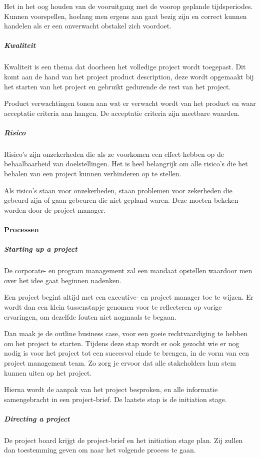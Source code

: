 \documentclass[]{article}
\begin{document}
Het in het oog houden van de vooruitgang met de voorop geplande tijdsperiodes. Kunnen voorspellen, hoelang men ergens aan gaat bezig zijn en correct kunnen handelen als er een onverwacht obstakel zich voordoet.

\subparagraph{Kwaliteit}
Kwaliteit is een thema dat doorheen het volledige project wordt toegepast. Dit komt aan de hand van het project product description, deze wordt opgemaakt bij het starten van het project en gebruikt gedurende de rest van het project.

Product verwachtingen tonen aan wat er verwacht wordt van het product en waar acceptatie criteria aan hangen. De acceptatie criteria zijn meetbare waarden.

\subparagraph{Risico}
Risico's zijn onzekerheden die als ze voorkomen een effect hebben op de behaalbaarheid van doelstellingen. Het is heel belangrijk om alle risico's die het behalen van een project kunnen verhinderen op te stellen.

Als risico's staan voor onzekerheden, staan problemen voor zekerheden die gebeurd zijn of gaan gebeuren die niet gepland waren. Deze moeten bekeken worden door de project manager.

\paragraph{Processen}

\subparagraph{Starting up a project}
De corporate- en program management zal een mandaat opstellen waardoor men over het idee gaat beginnen nadenken. 

Een project begint altijd met een executive- en project manager toe te wijzen. Er wordt dan een klein tussenstapje genomen voor te reflecteren op vorige ervaringen, om dezelfde fouten niet nogmaals te begaan. 

Dan maak je de outline business case, voor een goeie rechtvaardiging te hebben om het project te starten. Tijdens deze stap wordt er ook gezocht wie er nog nodig is voor het project tot een succesvol einde te brengen, in de vorm van een project management team. Zo zorg je ervoor dat alle stakeholders hun stem kunnen uiten op het project. 

Hierna wordt de aanpak van het project besproken, en alle informatie samengebracht in een project-brief.
De laatste stap is de initiation stage.

\subparagraph{Directing a project}
De project board krijgt de project-brief en het initiation stage plan. Zij zullen dan toestemming geven om naar het volgende process te gaan.
\end{document}
